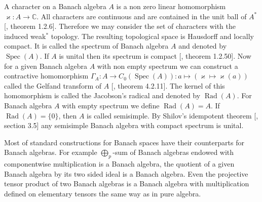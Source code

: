 A character on a Banach algebra $A$ is a non zero linear homomorphism
$\varkappa:A\to\mathbb{C}$. All characters are continuous and are contained in
the unit ball of $A^*$  [\cite{HelBanLocConvAlg}, theorem 1.2.6]. Therefore we
may consider the set of characters with the induced weak$^*$ topology. The
resulting topological space is Hausdorff and locally compact. It is called the
spectrum of Banach algebra $A$ and denoted by $\operatorname{Spec}(A)$. If $A$
is unital then its spectrum is compact [\cite{HelBanLocConvAlg}, theorem
1.2.50]. Now for a given Banach algebra $A$ with non empty spectrum we can
construct a contractive homomorphism $\Gamma_A:A\to
C_0(\operatorname{Spec}(A)):a\mapsto(\varkappa\mapsto \varkappa(a))$ called the
Gelfand transform of $A$ [\cite{HelBanLocConvAlg}, theorem 4.2.11]. The kernel
of this homomorphism is called the Jacobson's radical and denoted by
$\operatorname{Rad}(A)$. For Banach algebra $A$ with empty spectrum we define
$\operatorname{Rad}(A)=A$. If $\operatorname{Rad}(A)= \{0 \}$, then $A$ is
called semisimple. By Shilov's idempotent theorem [\cite{KaniBanAlg}, section
3.5] any semisimple Banach algebra with compact spectrum is unital.

Most of standard constructions for Banach spaces have their counterparts for
Banach algebras. For example $\bigoplus_p$-sum of Banach algebras endowed with
componentwise multiplication is a Banach algebra, the quotient of a given Banach
algebra by its two sided ideal is a Banach algebra. Even the projective tensor
product of two Banach algebras is a Banach algebra with multiplication defined
on elementary tensors the same way as in pure algebra.

